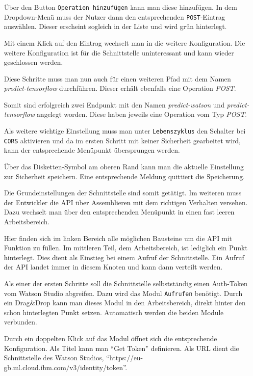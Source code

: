 Über den Button \texttt{Operation hinzufügen} kann man diese hinzufügen. In dem Dropdown-Menü muss der Nutzer dann den
entsprechenden \texttt{POST}-Eintrag auswählen. Dieser erscheint sogleich in der Liste und wird grün hinterlegt.

Mit einem Klick auf den Eintrag wechselt man in die weitere Konfiguration. Die weitere Konfiguration ist für die
Schnittstelle uninteressant und kann wieder geschlossen werden.

Diese Schritte muss man nun auch für einen weiteren Pfad mit dem Namen \textit{predict-tensorflow} durchführen. Dieser
erhält ebenfalls eine Operation \textit{POST}.

Somit sind erfolgreich zwei Endpunkt mit den Namen \textit{predict-watson} und \textit{predict-tensorflow} angelegt worden.
Diese haben jeweils eine Operation vom Typ \textit{POST}.

Als weitere wichtige Einstellung muss man unter \texttt{Lebenszyklus} den Schalter bei \texttt{CORS} aktivieren und da
im ersten Schritt mit keiner Sicherheit gearbeitet wird, kann der entsprechende Menüpunkt übersprungen werden.

Über das Disketten-Symbol am oberen Rand kann man die aktuelle Einstellung zur Sicherheit speichern. Eine entsprechende
Meldung quittiert die Speicherung.

Die Grundeinstellungen der Schnittstelle sind somit getätigt. Im weiteren muss der Entwickler die API über Assemblieren
mit dem richtigen Verhalten versehen. Dazu wechselt man über den entsprechenden Menüpunkt in einen fast leeren
Arbeitsbereich.

Hier finden sich im linken Bereich alle möglichen Bausteine um die API mit Funktion zu füllen. Im mittleren Teil, dem
Arbeitsbereich, ist lediglich ein Punkt hinterlegt. Dies dient als Einstieg bei einem Aufruf der Schnittstelle. Ein
Aufruf der API landet immer in diesem Knoten und kann dann verteilt werden.

Als einer der ersten Schritte soll die Schnittstelle selbstständig einen Auth-Token vom Watson Studio abgreifen. Dazu
wird das Modul \texttt{Aufrufen} benötigt. Durch ein Drag\&Drop kann man dieses Modul in den Arbeitsbereich, direkt
hinter den schon hinterlegten Punkt setzen. Automatisch werden die beiden Module verbunden.

Durch ein doppelten Klick auf das Modul öffnet sich die entsprechende Konfiguration. Als Titel kann man \enquote{Get Token}
definieren. Als URL dient die Schnittstelle des Watson Studios, \enquote{https://eu-gb.ml.cloud.ibm.com/v3/identity/token}.

